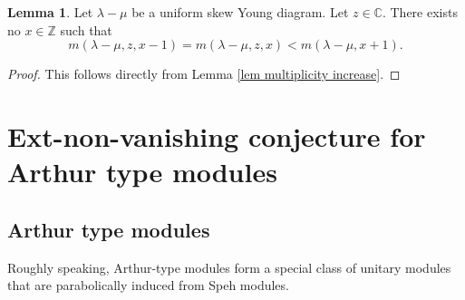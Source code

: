 \documentclass[11pt]{amsart}
\numberwithin{equation}{section}
\theoremstyle{definition}
\newtheorem{lemma}[thm]{Lemma}
\begin{document}




\begin{lemma} \label{lem steady no increase}
Let $\lambda-\mu$ be a uniform skew Young diagram. Let $z \in \mathbb C$. There exists no $x \in \mathbb Z$ such that 
\[  m(\lambda-\mu, z, x-1) =m(\lambda-\mu, z, x) < m (\lambda-\mu, x+1) .
\]
\end{lemma}

\begin{proof}
This follows directly from Lemma \ref{lem multiplicity increase}.
\end{proof}




\section{Ext-non-vanishing conjecture for Arthur type modules}\label{sec ext non-vanishing conj for Arthur}




\subsection{Arthur type modules} \label{ss arthur type modules}

Roughly speaking, Arthur-type modules form a special class of unitary modules that are parabolically induced from Speh modules.
\end{document}
